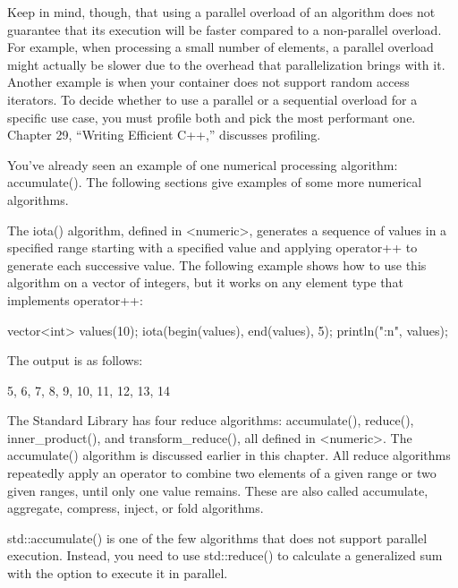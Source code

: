 Keep in mind, though, that using a parallel overload of an algorithm does not guarantee that its execution will be faster compared to a non-parallel overload. For example, when processing a small number of elements, a parallel overload might actually be slower due to the overhead that parallelization brings with it. Another example is when your container does not support random access iterators. To decide whether to use a parallel or a sequential overload for a specific use case, you must profile both and pick the most performant one. Chapter 29, “Writing Efficient C++,” discusses profiling.


You’ve already seen an example of one numerical processing algorithm: accumulate(). The following sections give examples of some more numerical algorithms.


The iota() algorithm, defined in <numeric>, generates a sequence of values in a specified range starting with a specified value and applying operator++ to generate each successive value. The following example shows how to use this algorithm on a vector of integers, but it works on any element type that implements operator++:

\begin{cpp}
vector<int> values(10);
iota(begin(values), end(values), 5);
println("{:n}", values);
\end{cpp}

The output is as follows:

\begin{shell}
5, 6, 7, 8, 9, 10, 11, 12, 13, 14
\end{shell}


The Standard Library has four reduce algorithms: accumulate(), reduce(), inner\_product(), and transform\_reduce(), all defined in <numeric>. The accumulate() algorithm is discussed earlier in this chapter. All reduce algorithms repeatedly apply an operator to combine two elements of a given range or two given ranges, until only one value remains. These are also called accumulate, aggregate, compress, inject, or fold algorithms.


std::accumulate() is one of the few algorithms that does not support parallel execution. Instead, you need to use std::reduce() to calculate a generalized sum with the option to execute it in parallel.

